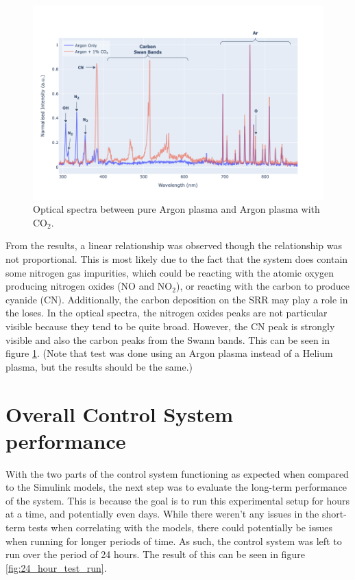  \begin{figure}[h!]
	\centering
	\includegraphics[width=0.95\linewidth]{chapter_5/figures/optica_spectra_co2.png} 
	\caption{Optical spectra between pure Argon plasma and Argon plasma with CO$_2$.}
	\label{fig:optica_spectra_co2}
\end{figure} 

 From the results, a linear relationship was observed though the relationship was not proportional. This is most likely due to the fact that the system does contain some nitrogen gas impurities, which could be reacting with the atomic oxygen producing nitrogen oxides (NO and NO$_2$), or reacting with the carbon to produce cyanide (CN). Additionally, the carbon deposition on the SRR may play a role in the loses. In the optical spectra, the nitrogen oxides peaks are not particular visible because they tend to be quite broad. However, the CN peak is strongly visible and also the carbon peaks from the Swann bands. This can be seen in figure \ref{fig:optica_spectra_co2}. (Note that test was done using an Argon plasma instead of a Helium plasma, but the results should be the same.)
 





\section{Overall Control System performance}


With the two parts of the control system functioning as expected when compared to the Simulink models, the next step was to evaluate the long-term performance of the system. This is because the goal is to run this experimental setup for hours at a time, and potentially even days. While there weren't any issues in the short-term tests when correlating with the models, there could potentially be issues when running for longer periods of time. As such, the control system  was left to run over the period of 24 hours. The result of this can be seen in figure \ref{fig:24_hour_test_run}.

